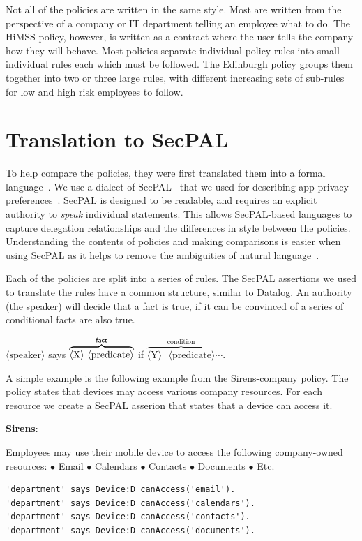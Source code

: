 \documentclass[conference,twocolumn]{IEEEtran}
\newenvironment{policyrule}[1]{%
  \begin{mdframed}\footnotesize
    \noindent\textbf{\sffamily #1}:~\itshape%
  }{%
  \end{mdframed}
}
\begin{document}
Not all of the policies are written in the same style.
Most are written from the perspective of a company or IT department telling an employee what to do.
The HiMSS policy, however, is written as a contract where the user tells the company how they will behave.
Most policies separate individual policy rules into small individual rules each which must be followed.
The Edinburgh policy groups them together into two or three large rules, with different increasing sets of sub-rules for low and high risk employees to follow.

\section{Translation to SecPAL}
\label{sec:translation_to_secpal}

To help compare the policies, they were first translated them into a formal language~\cite{hallett_specifying_2016}.
We use a dialect of SecPAL~\cite{becker_secpal:_2010} that we used for describing app privacy preferences~\cite{hallett_apppal_2016}.
SecPAL is designed to be readable, and requires an explicit authority to \emph{speak} individual statements.
This allows SecPAL-based languages to capture delegation relationships and the differences in style between the policies.
Understanding the contents of policies and making comparisons is easier when using SecPAL as it helps to remove the ambiguities of natural language~\cite{hallett_specifying_2016}.

Each of the policies are split into a series of rules.
The SecPAL assertions we used to translate the rules have a common structure, similar to Datalog.
An authority (the speaker) will decide that a fact is true, if it can be convinced of a series of conditional facts are also true. 

\begin{center}\ttfamily\footnotesize%
  \newcommand{\sptoken}[1]{$\langle\text{#1}\rangle$}
  \sptoken{speaker} says $\overbrace{\text{\sptoken{X} \sptoken{predicate}}}^{\text{\sf fact}}$ if $\overbrace{\text{\sptoken{Y} \sptoken{predicate}}}^{\text{condition}}\cdots$.
\end{center}

A simple example is the following example from the Sirens-company policy.
The policy states that devices may access various company resources.
For each resource we create a SecPAL asserion that states that a device can access it.
\begin{policyrule}{Sirens}
  Employees may use their mobile device to access the following company-owned resources:
  \newline $\bullet$ Email $\bullet$ Calendars $\bullet$ Contacts $\bullet$ Documents $\bullet$ Etc.
  \begin{lstlisting}
'department' says Device:D canAccess('email'). 
'department' says Device:D canAccess('calendars'). 
'department' says Device:D canAccess('contacts'). 
'department' says Device:D canAccess('documents').
  \end{lstlisting}
\end{policyrule}
\end{document}
